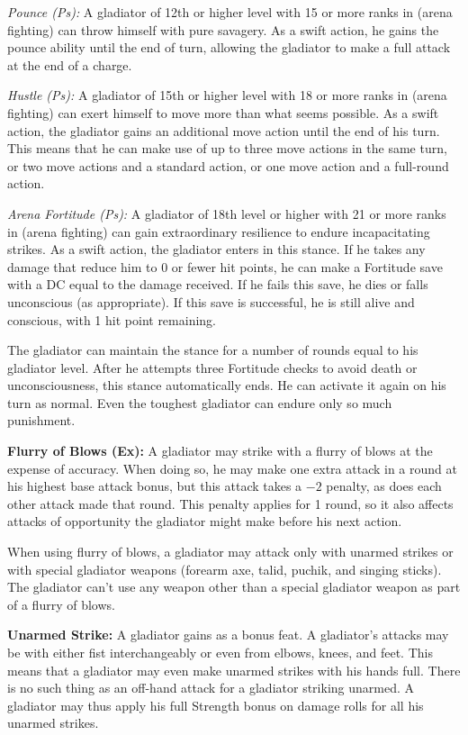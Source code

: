 \textit{Pounce (Ps):} A gladiator of 12th or higher level with 15 or more ranks in  (arena fighting) can throw himself with pure savagery. As a swift action, he gains the pounce ability until the end of turn, allowing the gladiator to make a full attack at the end of a charge.

\textit{Hustle (Ps):} A gladiator of 15th or higher level with 18 or more ranks in  (arena fighting) can exert himself to move more than what seems possible. As a swift action, the gladiator gains an additional move action until the end of his turn. This means that he can make use of up to three move actions in the same turn, or two move actions and a standard action, or one move action and a full-round action.

\textit{Arena Fortitude (Ps):} A gladiator of 18th level or higher with 21 or more ranks in  (arena fighting) can gain extraordinary resilience to endure incapacitating strikes. As a swift action, the gladiator enters in this stance. If he takes any damage that reduce him to 0 or fewer hit points, he can make a Fortitude save with a DC equal to the damage received. If he fails this save, he dies or falls unconscious (as appropriate). If this save is successful, he is still alive and conscious, with 1 hit point remaining.

The gladiator can maintain the stance for a number of rounds equal to his gladiator level. After he attempts three Fortitude checks to avoid death or unconsciousness, this stance automatically ends. He can activate it again on his turn as normal. Even the toughest gladiator can endure only so much punishment.

\textbf{Flurry of Blows (Ex):} A gladiator may strike with a flurry of blows at the expense of accuracy. When doing so, he may make one extra attack in a round at his highest base attack bonus, but this attack takes a $-2$ penalty, as does each other attack made that round. This penalty applies for 1 round, so it also affects attacks of opportunity the gladiator might make before his next action. 

When using flurry of blows, a gladiator may attack only with unarmed strikes or with special gladiator weapons (forearm axe, talid, puchik, and singing sticks). The gladiator can't use any weapon other than a special gladiator weapon as part of a flurry of blows.

\textbf{Unarmed Strike:} A gladiator gains  as a bonus feat. A gladiator's attacks may be with either fist interchangeably or even from elbows, knees, and feet. This means that a gladiator may even make unarmed strikes with his hands full. There is no such thing as an off-hand attack for a gladiator striking unarmed. A gladiator may thus apply his full Strength bonus on damage rolls for all his unarmed strikes.

